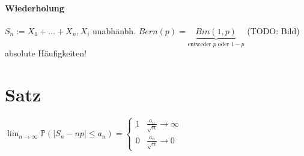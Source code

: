 \documentclass[a4paper,11pt,notitlepage]{report}
\newcommand{\Prim}{{\ensuremath{\mathbb{P}}}}
\begin{document}

\paragraph{Wiederholung}
$S_n := X_1 + \ldots + X_n, X_i$ unabhänbh. $Bern(p) = \underbrace{Bin(1,p)}_{\text{entweder } p \text{ oder } 1-p}$
\newline
(TODO: Bild) \newline
absolute Häufigkeiten!

\section*{Satz} $\lim_{n \rightarrow \infty} {\Prim(|S_n - np| \leq a_n)} = \begin{cases} 1 & \frac{a_n}{\sqrt{n}} \rightarrow \infty \\ 0 & \frac{a_n}{\sqrt{n}} \rightarrow 0 \end{cases}$
\end{document}
